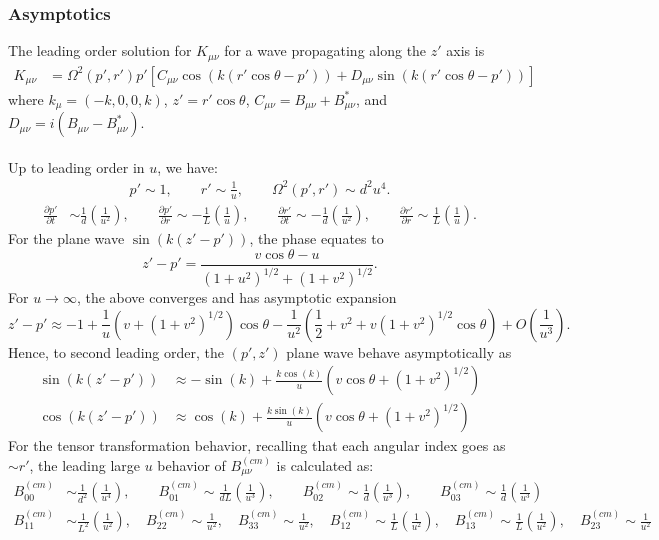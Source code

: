 \documentclass[10pt,letterpaper]{article}
\begin{document}
\subsubsection*{Asymptotics}
The leading order solution for $K_{\mu\nu}$ for a wave propagating along the $z'$ axis is
\begin{align}
K_{\mu\nu} &= \Omega^2(p',r')p'\left[ C_{\mu\nu}  \cos(k(r'\cos\theta - p')) + D_{\mu\nu} \sin(k(r'\cos\theta - p')) \right]
\end{align}
where $k_{\mu} = (-k,0,0,k)$, $z' = r'\cos\theta$, $C_{\mu\nu} = B_{\mu\nu}+B^*_{\mu\nu} $, and $D_{\mu\nu} = i(B_{\mu\nu}-B^*_{\mu\nu})$.
\\ \\
Up to leading order in $u$, we have:
\begin{align}
p'\sim 1,\qquad r' \sim \frac{1}{u},\qquad \Omega^2(p',r') \sim d^2 u^4.
\end{align}
\begin{align}
\frac{\partial p'}{\partial t} & \sim \frac{1}{d}\left( \frac{1}{u^2}\right),\qquad
\frac{\partial p'}{\partial r}  \sim 	-\frac{1}{L} \left(\frac{1}{u}\right),\qquad
\frac{\partial r'}{\partial t}  \sim -\frac{1}{d}\left( \frac{1}{u^2}\right),\qquad
\frac{\partial r'}{\partial r}  \sim \frac{1}{L}\left( \frac{1}{u}\right).
\end{align}
For the plane wave $\sin(k(z'-p'))$, the phase equates to
\begin{equation}
z'-p' = \frac{v\cos\theta - u}{(1+u^2)^{1/2}+(1+v^2)^{1/2}}.
\end{equation}
For $u \to \infty$, the above converges and has asymptotic expansion
\begin{equation}
z'-p' \approx -1 + \frac{1}{u}(v+(1+v^2)^{1/2})\cos\theta - \frac{1}{u^2}\left( \frac12 + v^2 +v(1+v^2)^{1/2}\cos\theta\right) +  O\left( \frac{1}{u^3}\right).
\end{equation}
Hence, to second leading order, the $(p',z')$ plane wave behave asymptotically as
\begin{align}
\sin(k(z'-p')) &\approx -\sin(k) + \frac{k\cos(k)}{u}(v\cos\theta+(1+v^2)^{1/2})\nonumber\\
\cos(k(z'-p'))&\approx \cos(k) + \frac{k\sin(k)}{u}(v\cos\theta+(1+v^2)^{1/2})
\end{align}
For the tensor transformation behavior, recalling that each angular index goes as $\sim r'$, the leading large $u$ behavior of $B_{\mu\nu}^{(cm)}$ is calculated as:
\begin{align}
B^{(cm)}_{00} &\sim \frac{1}{d^2}\left( \frac{1}{u^4}\right),\qquad 
B^{(cm)}_{01} \sim \frac{1}{dL}\left( \frac{1}{u^3}\right),\qquad 
B^{(cm)}_{02} \sim \frac{1}{d}\left( \frac{1}{u^3}\right),\qquad 
B^{(cm)}_{03} \sim \frac{1}{d}\left( \frac{1}{u^3}\right) \\
B^{(cm)}_{11} &\sim \frac{1}{L^2}\left( \frac{1}{u^2}\right),\quad 
B^{(cm)}_{22} \sim \frac{1}{u^2},\quad 
B^{(cm)}_{33} \sim \frac{1}{u^2} ,\quad 
B^{(cm)}_{12} \sim \frac{1}{L}\left( \frac{1}{u^2}\right) ,\quad 
B^{(cm)}_{13} \sim \frac{1}{L}\left( \frac{1}{u^2}\right) ,\quad 
B^{(cm)}_{23} \sim \frac{1}{u^2}\nonumber
\end{align}
\end{document}
